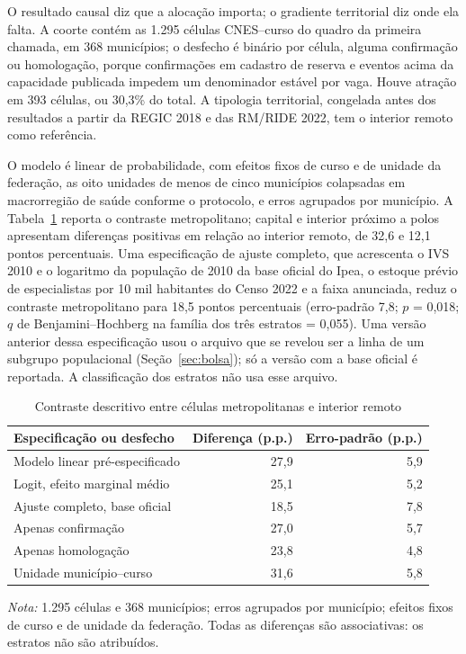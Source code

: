\documentclass[11pt,a4paper]{article}
\begin{document}
O resultado causal diz que a alocação importa; o gradiente territorial diz onde
ela falta. A coorte contém as 1.295 células CNES--curso do quadro da primeira
chamada, em 368 municípios; o desfecho é binário por célula, alguma confirmação
ou homologação, porque confirmações em cadastro de reserva e eventos acima da
capacidade publicada impedem um denominador estável por vaga. Houve atração em
393 células, ou 30,3\% do total. A tipologia territorial, congelada antes dos
resultados a partir da REGIC 2018 e das RM/RIDE 2022, tem o interior remoto
como referência.

O modelo é linear de probabilidade, com efeitos fixos de curso e de unidade da
federação, as oito unidades de menos de cinco municípios colapsadas em
macrorregião de saúde conforme o protocolo, e erros agrupados por município. A
Tabela~\ref{tab:a4} reporta o contraste metropolitano; capital e interior
próximo a polos apresentam diferenças positivas em relação ao interior remoto,
de 32,6 e 12,1 pontos percentuais. Uma especificação de ajuste completo, que acrescenta o IVS 2010 e o logaritmo
da população de 2010 da base oficial do Ipea, o estoque prévio de especialistas
por 10 mil habitantes do Censo 2022 e a faixa anunciada, reduz o contraste
metropolitano para 18,5 pontos percentuais (erro-padrão 7,8; $p$ = 0,018; $q$ de
Benjamini--Hochberg na família dos três estratos = 0,055). Uma versão anterior
dessa especificação usou o arquivo que se revelou ser a linha de um subgrupo
populacional (Seção~\ref{sec:bolsa}); só a versão com a base oficial é reportada. A
classificação dos estratos não usa esse arquivo.

\begin{table}[htbp]
\centering
\small
\caption{Contraste descritivo entre células metropolitanas e interior remoto}
\label{tab:a4}
\begin{tabular}{lrr}
\toprule
Especificação ou desfecho & Diferença (p.p.) & Erro-padrão (p.p.) \\
\midrule
Modelo linear pré-especificado & 27,9 & 5,9 \\
Logit, efeito marginal médio & 25,1 & 5,2 \\
Ajuste completo, base oficial & 18,5 & 7,8 \\
Apenas confirmação & 27,0 & 5,7 \\
Apenas homologação & 23,8 & 4,8 \\
Unidade município--curso & 31,6 & 5,8 \\
\bottomrule
\end{tabular}

\vspace{2pt}
\begin{minipage}{0.86\textwidth}
\footnotesize \textit{Nota:} 1.295 células e 368 municípios; erros agrupados por
município; efeitos fixos de curso e de unidade da federação. Todas as
diferenças são associativas: os estratos não são atribuídos.
\end{minipage}
\end{table}
\end{document}
